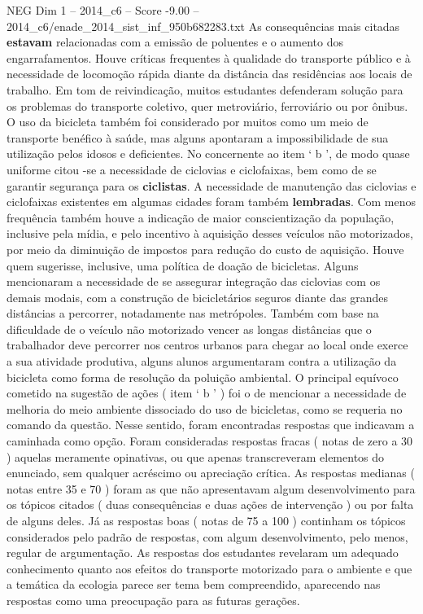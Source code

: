 \begin{textsample}{NEG Dim 1 – 2014\_c6 – Score -9.00 – 2014\_c6/enade\_2014\_sist\_inf\_950b682283.txt}
As consequências mais citadas \textbf{estavam} relacionadas com a emissão de poluentes e o aumento dos engarrafamentos.
Houve críticas frequentes à qualidade do transporte público e à necessidade de locomoção rápida diante da distância das residências aos locais de trabalho.
Em tom de reivindicação, muitos estudantes defenderam solução para os problemas do transporte coletivo, quer metroviário, ferroviário ou por ônibus.
O uso da bicicleta também foi considerado por muitos como um meio de transporte benéfico à saúde, mas alguns apontaram a impossibilidade de sua utilização pelos idosos e deficientes.
No concernente ao item ‘ b ’, de modo quase uniforme citou -se a necessidade de ciclovias e ciclofaixas, bem como de se garantir segurança para os \textbf{ciclistas}.
A necessidade de manutenção das ciclovias e ciclofaixas existentes em algumas cidades foram também \textbf{lembradas}.
Com menos frequência também houve a indicação de maior conscientização da população, inclusive pela mídia, e pelo incentivo à aquisição desses veículos não motorizados, por meio da diminuição de impostos para redução do custo de aquisição.
Houve quem sugerisse, inclusive, uma política de doação de bicicletas.
Alguns mencionaram a necessidade de se assegurar integração das ciclovias com os demais modais, com a construção de bicicletários seguros diante das grandes distâncias a percorrer, notadamente nas metrópoles.
Também com base na dificuldade de o veículo não motorizado vencer as longas distâncias que o trabalhador deve percorrer nos centros urbanos para chegar ao local onde exerce a sua atividade produtiva, alguns alunos argumentaram contra a utilização da bicicleta como forma de resolução da poluição ambiental.
O principal equívoco cometido na sugestão de ações ( item ‘ b ’ ) foi o de mencionar a necessidade de melhoria do meio ambiente dissociado do uso de bicicletas, como se requeria no comando da questão.
Nesse sentido, foram encontradas respostas que indicavam a caminhada como opção.
Foram consideradas respostas fracas ( notas de zero a 30 ) aquelas meramente opinativas, ou que apenas transcreveram elementos do enunciado, sem qualquer acréscimo ou apreciação crítica.
As respostas medianas ( notas entre 35 e 70 ) foram as que não apresentavam algum desenvolvimento para os tópicos citados ( duas consequências e duas ações de intervenção ) ou por falta de alguns deles.
Já as respostas boas ( notas de 75 a 100 ) continham os tópicos considerados pelo padrão de respostas, com algum desenvolvimento, pelo menos, regular de argumentação.
As respostas dos estudantes revelaram um adequado conhecimento quanto aos efeitos do transporte motorizado para o ambiente e que a temática da ecologia parece ser tema bem compreendido, aparecendo nas respostas como uma preocupação para as futuras gerações.

\end{textsample}
